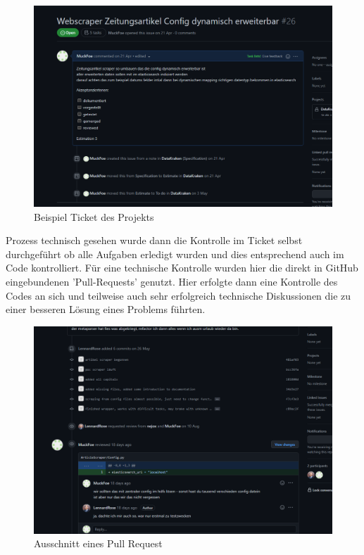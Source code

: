 \documentclass[12pt,oneside,a4paper,parskip]{scrbook}
\begin{document}
\begin{figure}[H]
	\caption{Beispiel Ticket des Projekts}
	\label{gitHubTicket}
	\centering
	\includegraphics[scale=0.45]{pictures/gitHubTicket.png}
\end{figure}
Prozess technisch gesehen wurde dann die Kontrolle im Ticket selbst durchgef\"uhrt ob alle Aufgaben erledigt wurden und dies entsprechend auch im Code kontrolliert. F\"ur eine technische Kontrolle wurden hier die direkt in GitHub eingebundenen 'Pull-Requests' genutzt. Hier erfolgte dann eine Kontrolle des Codes an sich und teilweise auch sehr erfolgreich technische Diskussionen die zu einer besseren L\"osung eines Problems f\"uhrten.
\begin{figure}[H]
	\caption{Ausschnitt eines Pull Request}
	\label{gitHubPullRequest}
	\centering
	\includegraphics[scale=0.45]{pictures/gitHubPullRequest.png}
\end{figure}
\end{document}
